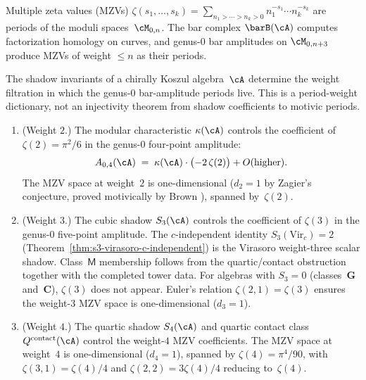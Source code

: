 Multiple zeta values (MZVs)
$\zeta(s_1, \ldots, s_k) =
\sum_{n_1 > \cdots > n_k > 0} n_1^{-s_1} \cdots n_k^{-s_k}$
are periods of the moduli spaces~$\cM_{0,n}$.
The bar complex $\barB(\cA)$ computes factorization homology
on curves, and genus-$0$ bar amplitudes on $\cM_{0,n+3}$
produce MZVs of weight $\leq n$ as their periods.

\begin{theorem}%
\label{thm:shadow-mzv-dictionary}%
%
%
The shadow invariants of a chirally Koszul algebra~$\cA$ determine the
weight filtration in which the genus-$0$ bar-amplitude periods live.
This is a period-weight dictionary, not an injectivity theorem from
shadow coefficients to motivic periods.
\begin{enumerate}[label=\textup{(\roman*)}]
\item \textup{(Weight $2$.)}
The modular characteristic $\kappa(\cA)$ controls the
coefficient of $\zeta(2) = \pi^2/6$ in the genus-$0$
four-point amplitude:
\[
A_{0,4}(\cA)
\;=\; \kappa(\cA) \cdot \bigl(-2\,\zeta(2)\bigr) + O(\text{higher}).
\]
The MZV space at weight~$2$ is one-dimensional
\textup{(}$d_2 = 1$ by Zagier's conjecture, proved motivically
by Brown \cite{Brown12}\textup{)}, spanned by~$\zeta(2)$.

\item \textup{(Weight $3$.)}
The cubic shadow $S_3(\cA)$ controls the coefficient of
$\zeta(3)$ in the genus-$0$ five-point amplitude.
The $c$-independent identity
$S_3(\mathrm{Vir}_c)=2$
\textup{(}Theorem~\ref{thm:s3-virasoro-c-independent}\textup{)}
is the Virasoro weight-three scalar shadow.  Class~$\mathsf{M}$
membership follows from the quartic/contact obstruction together with
the completed tower data.
For algebras with $S_3 = 0$
\textup{(}classes~$\mathbf{G}$ and~$\mathbf{C}$\textup{)},
$\zeta(3)$ does not appear.
Euler's relation $\zeta(2,1) = \zeta(3)$ ensures the weight-$3$
MZV space is one-dimensional ($d_3 = 1$).

\item \textup{(Weight $4$.)}
The quartic shadow $S_4(\cA)$ and quartic contact class
$Q^{\mathrm{contact}}(\cA)$ control the weight-$4$ MZV
coefficients. The MZV space at weight~$4$ is one-dimensional
\textup{(}$d_4 = 1$\textup{)}, spanned by $\zeta(4) = \pi^4/90$,
with $\zeta(3,1) = \zeta(4)/4$ and $\zeta(2,2) = 3\zeta(4)/4$
reducing to~$\zeta(4)$.


\end{enumerate}
\end{theorem}
